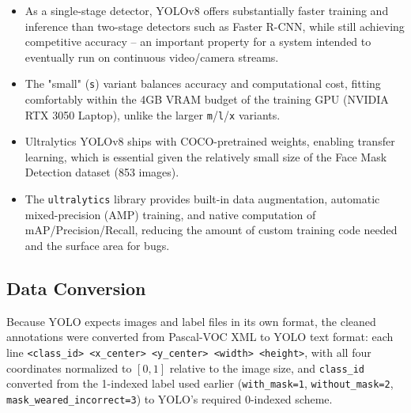 \documentclass[12pt]{article}
\begin{document}
\begin{itemize}[noitemsep]
    \item As a single-stage detector, YOLOv8 offers substantially faster
          training and inference than two-stage detectors such as Faster
          R-CNN, while still achieving competitive accuracy -- an important
          property for a system intended to eventually run on
          continuous video/camera streams.
    \item The "small" (\texttt{s}) variant balances accuracy and
          computational cost, fitting comfortably within the 4GB VRAM
          budget of the training GPU (NVIDIA RTX 3050 Laptop), unlike the
          larger \texttt{m}/\texttt{l}/\texttt{x} variants.
    \item Ultralytics YOLOv8 ships with COCO-pretrained weights, enabling
          transfer learning, which is essential given the relatively small
          size of the Face Mask Detection dataset (853 images).
    \item The \texttt{ultralytics} library provides built-in data
          augmentation, automatic mixed-precision (AMP) training, and
          native computation of mAP/Precision/Recall, reducing the amount
          of custom training code needed and the surface area for bugs.
\end{itemize}

\subsection{Data Conversion}
Because YOLO expects images and label files in its own format, the cleaned
annotations were converted from Pascal-VOC XML to YOLO text format: each
line \texttt{<class\_id> <x\_center> <y\_center> <width> <height>}, with all
four coordinates normalized to $[0,1]$ relative to the image size, and
\texttt{class\_id} converted from the 1-indexed label used earlier
(\texttt{with\_mask=1}, \texttt{without\_mask=2},
\texttt{mask\_weared\_incorrect=3}) to YOLO's required 0-indexed scheme.
\end{document}

